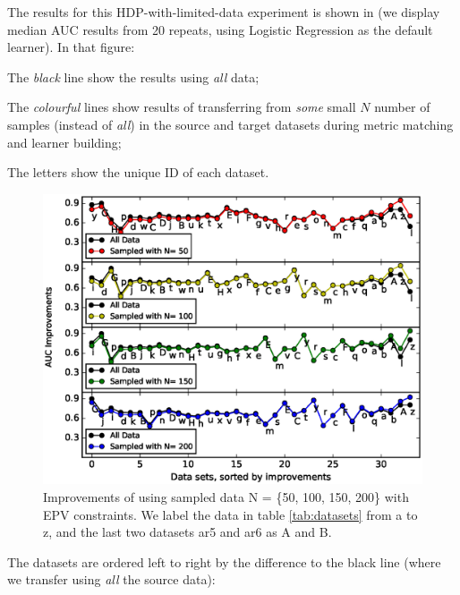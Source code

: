 The results for this HDP-with-limited-data experiment is shown in 
(we display median AUC results from 20 repeats, using  Logistic Regression
as the default learner). 
In that figure:
\squishlist
\item
  The {\em black} line show the results using {\em all} data;
\item
  The {\em colourful} lines show results of transferring from {\em some} small $N$ number of samples (instead of {\em all})
  in the source and target datasets during metric matching and learner building;
\item
  The letters show the unique ID of each dataset.
\squishend
\begin{figure}[t]
	\centering
	\includegraphics[width=0.66\linewidth]{Figures/raleigh/sample_epv.eps}
	\caption{Improvements of using sampled data N  = \{50, 100, 150, 200\} with EPV constraints. We label the data in table \ref{tab:datasets} from a to z, and the last two datasets ar5 and ar6 as A and B.}
	\label{fig:small_epv}
\end{figure}
The datasets are ordered left to right by the difference to the black line (where we transfer using {\em
  all} the source data):
